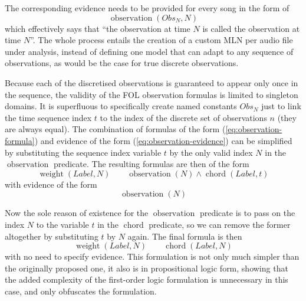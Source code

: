 \documentclass[letterpaper]{article} %
\begin{document}
The corresponding evidence needs to be provided for every song in the form of
\begin{equation}
\operatorname{observation}\left(Obs_N, N\right)\label{eq:observation-evidence}
\end{equation}
which effectively says that ``the observation at time $N$ is called the observation at time $N$''. The whole process entails the creation of a custom MLN per audio file under analysis, instead of defining one model that can adapt to any sequence of observations, as would be the case for true discrete observations.

Because each of the discretised observations is guaranteed to appear only once in the sequence, the validity of the FOL observation formulas is limited to singleton domains. It is superfluous to specifically create named constants $Obs_N$ just to link the time sequence index $t$ to the index of the discrete set of observations $n$ (they are always equal). The combination of formulas of the form (\ref{eq:observation-formula}) and evidence of the form (\ref{eq:observation-evidence}) can be simplified by substituting the sequence index variable $t$ by the only valid index $N$ in the $\operatorname{observation}$ predicate. The resulting formulas are then of the form
\begin{equation}
\operatorname{weight}\left(Label,N\right) \qquad \operatorname{observation}\left(N\right) \wedge \operatorname{chord}\left(Label, t\right)
\end{equation}
with evidence of the form
\begin{equation}
\operatorname{observation}\left(N\right)
\end{equation}

Now the sole reason of existence for the $\operatorname{observation}$ predicate is to pass on the index $N$ to the variable $t$ in the $\operatorname{chord}$ predicate, so we can remove the former altogether by substituting $t$ by $N$ again. The final formula is then
\begin{equation}
\operatorname{weight}\left(Label,N\right) \qquad \operatorname{chord}\left(Label, N\right)
\end{equation}
with no need to specify evidence. This formulation is not only much simpler than the originally proposed one, it also is in propositional logic form, showing that the added complexity of the first-order logic formulation is unnecessary in this case, and only obfuscates the formulation.
\end{document}
